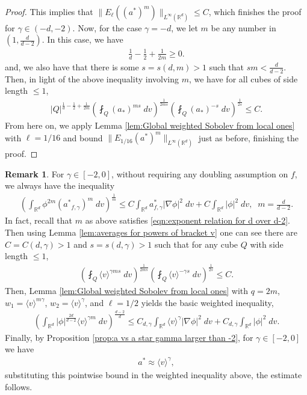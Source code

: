 \documentclass[12pt,american]{amsart}
\numberwithin{equation}{section}
\theoremstyle{plain}
\theoremstyle{definition}                  %
\newtheorem{rem}[thm]{Remark}
\def\astar{{a^*}}
\begin{document}
\begin{proof}
  This implies that $\|E_\ell((\astar)^m)\|_{L^\infty(\mathbb{R}^d)}\leq C$, which finishes the proof for $\gamma \in (-d,-2)$. Now, for the case $\gamma=-d$, we let $m$ be any number in $(1,\frac{d}{d-2})$. In this case, we have
  \begin{align*}
    \frac{1}{d}-\frac{1}{2}+\frac{1}{2m} \geq 0.	  
  \end{align*}	
  and, we also have that there is some $s=s(d,m)>1$ such that $sm<\frac{d}{d-2}$. Then, in light of the above inequality involving $m$, we have for all cubes of side length $\leq 1$,
  \begin{align*}
   |Q|^{\frac{1}{d}-\frac{1}{2}+\frac{1}{2m}}\left( \fint_Q (a_*)^{ms}\;dv \right)^{\frac{1}{2ms}}\left( \fint_Q (a_*)^{-s}\;dv\right)^{\frac{1}{2s}} \leq C.
  \end{align*}
  From here on, we apply Lemma \ref{lem:Global weighted Sobolev from local ones} with $\ell=1/16$ and bound $\| E_{1/16}(\astar)^m \|_{L^\infty(\mathbb{R}^d)}$ just as before, finishing the proof.
  
  \end{proof}
  
  

  \begin{rem}\label{rem:Sobolev weight astar to the m case gamma bigger -2}
  For $\gamma\in [-2,0]$, without requiring any doubling assumption on $f$, we always have the inequality
  \begin{align*}
    \left ( \int_{\mathbb{R}^d}  \phi^{2m}(\astar_{f,\gamma})^m \;dv\right )^{\frac{1}{m}}\leq C\int_{\mathbb{R}^d} a_{f,\gamma}^*|\nabla \phi|^2\;dv+C\int_{\mathbb{R}^d}|\phi|^2\;dv,\;\; m = \frac{d}{d-2}.
  \end{align*}
  In fact, recall that $m$ as above satisfies \eqref{eqn:exponent relation for d over d-2}. Then using Lemma \ref{lem:averages for powers of bracket v} one can see there are $C=C(d,\gamma)>1$ and $s=s(d,\gamma)>1$  such that for any cube $Q$ with side length $\leq 1$, 
  \begin{align*}
    \left ( \fint_{Q}\langle v \rangle^{\gamma m s} \;dv \right )^{\frac{1}{2m s}}\left (\fint_{Q}\langle v\rangle^{-\gamma s} \;dv \right )^{\frac{1}{2 s}} \leq C.
  \end{align*}
  Then, Lemma \ref{lem:Global weighted Sobolev from local ones} with $q=2m$, $w_1 = \langle v\rangle^{m\gamma}$, $w_2 = \langle v\rangle^\gamma$, and $\ell = 1/2$ yields the basic weighted inequality,
  \begin{align*}
    \left ( \int_{\mathbb{R}^d}|\phi|^{\frac{2d}{d-2}}\langle v\rangle^{\gamma m}\;dv\right )^{\frac{d-2}{d}} \leq C_{d,\gamma}\int_{\mathbb{R}^d}\langle v\rangle^\gamma|\nabla \phi|^2\;dv+C_{d,\gamma}\int_{\mathbb{R}^d}|\phi|^2\;dv.	  
  \end{align*}
  Finally, by Proposition \ref{prop:a vs a star gamma larger than -2}, for $\gamma\in [-2,0]$ we have
  \begin{align*}
    \astar \approx \langle v\rangle^\gamma,
  \end{align*}
  substituting this pointwise bound in the weighted inequality above, the estimate follows.
\end{rem}
 
\end{document}
